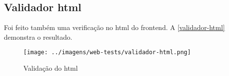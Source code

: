 \subsection{Validador \ac{html}}
Foi feito também uma verificação no \ac{html} do \ac{frontend}. A \autoref{validador-html} demonstra o resultado.

\begin{figure}[H]
	\centering
	\caption{\label{validador-html}Validação do \ac{html}}
	\texttt{[image: ../imagens/web-tests/validador-html.png]}
\end{figure}

